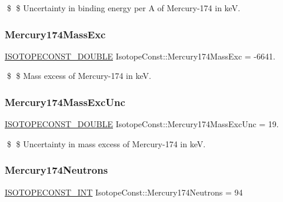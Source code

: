\$ \$ Uncertainty in binding energy per A of Mercury-\/174 in keV. \mbox{\label{group___isotope_const-_mercury-_hg174_ga3ef7a095a725b151ec22c2e43d9a508b}} 
\subsubsection{\texorpdfstring{Mercury174\+Mass\+Exc}{Mercury174MassExc}}
{\footnotesize\ttfamily \mbox{\hyperlink{group___isotope_const-_macros_ga8f45a7272ce02c0b4c65c44636ed719a}{I\+S\+O\+T\+O\+P\+E\+C\+O\+N\+S\+T\+\_\+\+D\+O\+U\+B\+LE}} Isotope\+Const\+::\+Mercury174\+Mass\+Exc = -\/6641.}

\$ \$ Mass excess of Mercury-\/174 in keV. \mbox{\label{group___isotope_const-_mercury-_hg174_gac51affedd87390ff76383cedaee6a7ca}} 
\subsubsection{\texorpdfstring{Mercury174\+Mass\+Exc\+Unc}{Mercury174MassExcUnc}}
{\footnotesize\ttfamily \mbox{\hyperlink{group___isotope_const-_macros_ga8f45a7272ce02c0b4c65c44636ed719a}{I\+S\+O\+T\+O\+P\+E\+C\+O\+N\+S\+T\+\_\+\+D\+O\+U\+B\+LE}} Isotope\+Const\+::\+Mercury174\+Mass\+Exc\+Unc = 19.}

\$ \$ Uncertainty in mass excess of Mercury-\/174 in keV. \mbox{\label{group___isotope_const-_mercury-_hg174_ga6d41d3ab1c57ec956ca01605f238b6bd}} 
\subsubsection{\texorpdfstring{Mercury174\+Neutrons}{Mercury174Neutrons}}
{\footnotesize\ttfamily \mbox{\hyperlink{group___isotope_const-_macros_ga5f18360b3e99483a35c32d789e62621c}{I\+S\+O\+T\+O\+P\+E\+C\+O\+N\+S\+T\+\_\+\+I\+NT}} Isotope\+Const\+::\+Mercury174\+Neutrons = 94}


